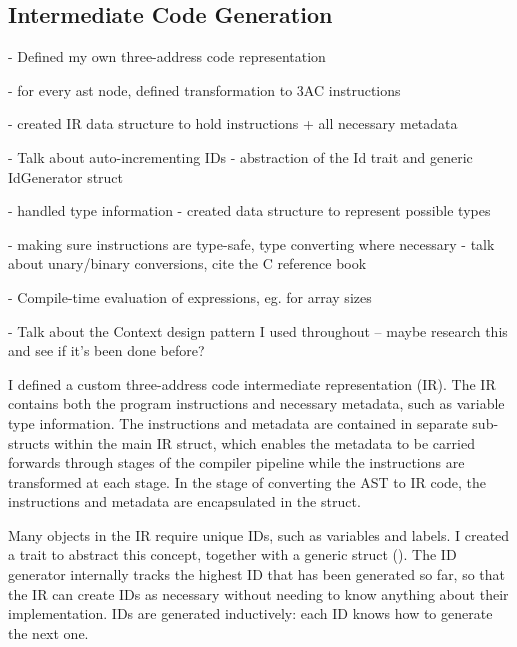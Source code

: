 \documentclass[00-main.tex]{subfiles}
\begin{document}
\subsection{Intermediate Code Generation}

\begin{Comment}
- Defined my own three-address code representation

- for every ast node, defined transformation to 3AC instructions

- created IR data structure to hold instructions + all necessary metadata

- Talk about auto-incrementing IDs - abstraction of the Id trait and generic IdGenerator struct

- handled type information - created data structure to represent possible types

- making sure instructions are type-safe, type converting where necessary - talk about unary/binary conversions, cite the C reference book

- Compile-time evaluation of expressions, eg. for array sizes

- Talk about the Context design pattern I used throughout -- maybe research this and see if it's been done before?
\end{Comment}

I defined a custom three-address code intermediate representation (IR).
The IR contains both the program instructions and necessary metadata, such as variable type information.
The instructions and metadata are contained in separate sub-structs within the main IR struct, which enables the metadata to be carried forwards through stages of the compiler pipeline while the instructions are transformed at each stage.
In the stage of converting the AST to IR code, the instructions and metadata are encapsulated in the  struct.

Many objects in the IR require unique IDs, such as variables and labels.
I created a  trait to abstract this concept, together with a generic  struct ().
The ID generator internally tracks the highest ID that has been generated so far, so that the IR can create IDs as necessary without needing to know anything about their implementation.
IDs are generated inductively: each ID knows how to generate the next one.
\end{document}
